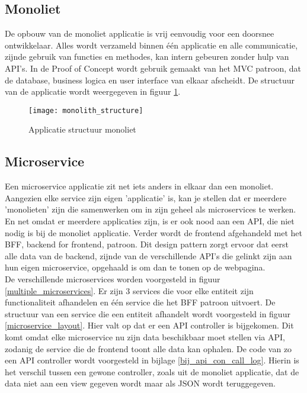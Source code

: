 \subsection{Monoliet}
De opbouw van de monoliet applicatie is vrij eenvoudig voor een doorsnee ontwikkelaar. Alles wordt verzameld binnen één applicatie en alle communicatie, zijnde gebruik van functies en methodes, kan intern gebeuren zonder hulp van API's. In de Proof of Concept wordt gebruik gemaakt van het MVC patroon, dat de database, business logica en user interface van elkaar afscheidt. De structuur van de applicatie wordt weergegeven in figuur \ref{monolith_structure}. \\

\begin{figure}[h!]
    \texttt{[image: monolith\_structure]}
    \caption{Applicatie structuur monoliet}
    \label{monolith_structure}
\end{figure}

\subsection{Microservice}
Een microservice applicatie zit net iets anders in elkaar dan een monoliet. Aangezien elke service zijn eigen 'applicatie' is, kan je stellen dat er meerdere 'monolieten' zijn die samenwerken om in zijn geheel als microservices te werken. En net omdat er meerdere applicaties zijn, is er ook nood aan een API, die niet nodig is bij de monoliet applicatie. Verder wordt de frontend afgehandeld met het BFF, backend for frontend, patroon. Dit design pattern zorgt ervoor dat eerst alle data van de backend, zijnde van de verschillende API's die gelinkt zijn aan hun eigen microservice, opgehaald is om dan te tonen op de webpagina. \\

De verschillende microservices worden voorgesteld in figuur \ref{multiple_microservices}. Er zijn 3 services die voor elke entiteit zijn functionaliteit afhandelen en één service die het BFF patroon uitvoert. De structuur van een service die een entiteit afhandelt wordt voorgesteld in figuur \ref{microservice_layout}. Hier valt op dat er een API controller is bijgekomen. Dit komt omdat elke microservice nu zijn data beschikbaar moet stellen via API, zodanig de service die de frontend toont alle data kan ophalen. De code van zo een API controller wordt voorgesteld in bijlage \ref{bij_api_con_call_log}. Hierin is het verschil tussen een gewone controller, zoals uit de monoliet applicatie, dat de data niet aan een view gegeven wordt maar als JSON wordt teruggegeven.\\

